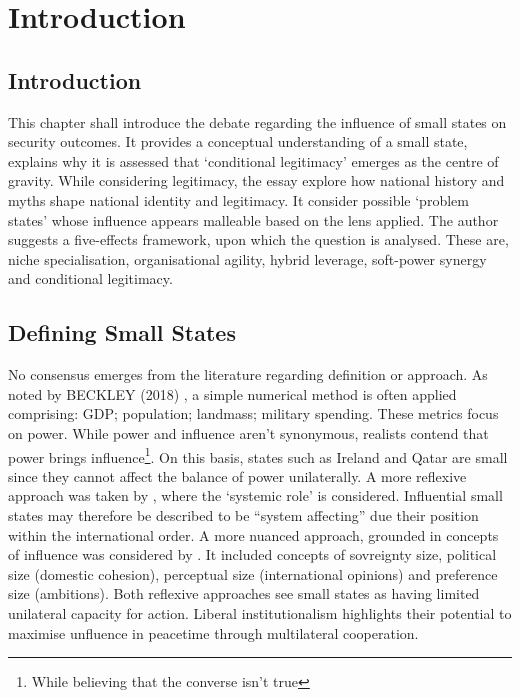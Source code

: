 
\chapter{Introduction}

\section*{Introduction}
This chapter shall introduce the debate regarding the influence of small states on security outcomes. It provides a conceptual understanding of a small state, explains why it is assessed that `conditional legitimacy' emerges as the centre of gravity. While considering legitimacy, the essay explore how national history and myths shape national identity and legitimacy. It consider possible `problem states' whose influence appears malleable based on the lens applied. The author suggests a five-effects framework, upon which the question is analysed. These are, niche specialisation, organisational agility, hybrid leverage, soft-power synergy and conditional legitimacy. 


\section*{Defining Small States}
No consensus emerges from the literature regarding definition or approach. As noted by BECKLEY (2018) \nocite{BECKLEY_2018}, a simple numerical method is often applied comprising: GDP; population; landmass; military spending. These metrics focus on power. While power and influence aren't synonymous, realists contend that power brings influence\footnote{While believing that the converse isn't true}. On this basis, states such as Ireland  and Qatar are small since they cannot affect the balance of power unilaterally. A more reflexive approach was taken by \textcite{KEOHANE_1969}, where the `systemic role' is considered. Influential small states may therefore be described to be ``system affecting'' due their position within the international order. A more nuanced approach, grounded in concepts of influence was considered by \textcite{THORHALLSSON_2006}. It included concepts of sovreignty size, political size (domestic cohesion), perceptual size (international opinions) and preference size (ambitions). Both reflexive approaches see small states as having limited unilateral capacity for action. Liberal institutionalism highlights their potential to maximise unfluence in peacetime through multilateral cooperation.





